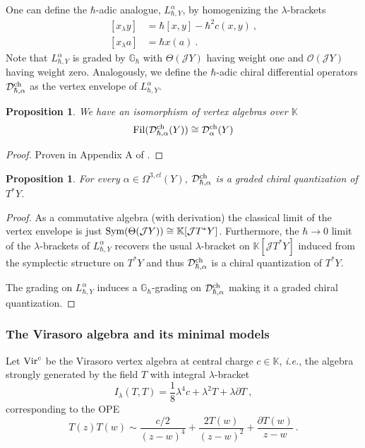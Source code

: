 \documentclass[11pt]{amsart}
\numberwithin{equation}{section}
\newtheorem{prop}[theo]{Proposition}
\theoremstyle{definition}
\newcommand{\bb}{\mathbb}
\newcommand{\mc}{\mathcal}
\newcommand{\D}{{\mathcal{D}}}
\newcommand{\ik}{{\bb K}}
\newcommand{\ch}{{\textup{ch}}}
\newcommand{\Vir}{{\textup{Vir}}}
\newcommand{\0}{{\textbf{0}}}
\newcommand{\Sym}{\textup{Sym}}
\newcommand{\del}{{{\partial}}}
\def\IG{\mathbb{G}}
\def\JJ{{\mc J}}
\def\OO{{\mc O}}
\def\ch{{\rm ch}}
\def \ie{{\it i.e.}}
\begin{document}
One can define the $\hbar$-adic analogue, $L^\alpha_{\hbar,Y}$, by homogenizing the $\lambda$-brackets 
\begin{equation}
\begin{split}
 [x_\lambda y]    &= \hbar [x,y]- \hbar^2 c(x,y) ~,\\
[x_\lambda a]  &=\hbar x(a)~.
\end{split}
\end{equation}
Note that $L_{\hbar,Y}^\alpha$ is graded by $\IG_\hbar$ with $\Theta(\JJ Y)$ having weight one and $\OO(\JJ Y)$ having weight zero. Analogously, we define the $\hbar$-adic chiral differential operators $\D^{\ch}_{\hbar,\alpha}$ as the vertex envelope of $L_{\hbar,Y}^\alpha$.

\begin{prop}\label{prop:hadic cdos are cdos}
	We have an isomorphism of vertex algebras over $\ik$
	\[
	{\rm Fil}(\D^{\ch}_{\hbar,\alpha}(Y)) \cong \D^{\ch}_{\alpha}(Y)
	\]
\end{prop}
\begin{proof}
	Proven in Appendix A of \cite{BuN2}.
\end{proof}



\begin{prop}
	For every $\alpha\in \Omega^{3,cl}(Y)$, $\D^{\ch}_{\hbar,\alpha}$ is a graded chiral quantization of $T^*Y$.
\end{prop}
\begin{proof}
  As a commutative algebra (with derivation) the classical limit of the vertex envelope is just $\Sym(\Theta(\JJ Y))\cong \ik[\JJ T^*Y]$. Furthermore, the $\hbar \rightarrow 0$ limit of the $\lambda$-brackets of $L^\alpha_{\hbar,Y}$ recovers the usual $\lambda$-bracket on $\ik[\JJ T^*Y]$ induced from the symplectic structure on $T^*Y$ and thus $\D^{\ch}_{\hbar,\alpha}$ is a chiral quantization of $T^*Y$.

	The grading on $L_{\hbar,Y}^\alpha$ induces a $\IG_\hbar$-grading on $\D^{\ch}_{\hbar,\alpha}$ making it a graded chiral quantization.
\end{proof}



\subsubsection{The Virasoro algebra and its minimal models}\label{ssec:dfn virasoro}

Let $\Vir^c$ be the Virasoro vertex algebra at central charge $c\in \ik$, \ie, the algebra strongly generated by the field $T$ with integral $\lambda$-bracket
\[
I_\lambda(T,T)= \frac{1}{8}\lambda^4 c + \lambda^2 T + \lambda \del T~,
\]
corresponding to the OPE
\[
T(z)T(w) \sim \frac{c/2}{(z-w)^4} + \frac{2 T(w)}{(z-w)^2} + \frac{\partial T(w)}{z-w}~.
\]
\end{document}
